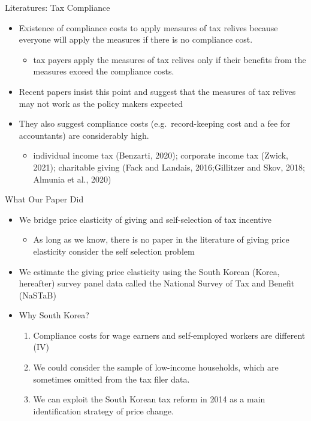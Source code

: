 \documentclass[
  ignorenonframetext,
  aspectratio=169,
]{beamer}
\providecommand{\tightlist}{%
  \setlength{\itemsep}{0pt}\setlength{\parskip}{0pt}}
\begin{document}
\begin{frame}{Literatures: Tax Compliance}
\protect\hypertarget{literatures-tax-compliance}{}
\begin{itemize}
\tightlist
\item
  Existence of compliance costs to apply measures of tax relives because everyone will apply the measures if there is no compliance cost.

  \begin{itemize}
  \tightlist
  \item
    tax payers apply the measures of tax relives only if their benefits from the measures exceed the compliance costs.
  \end{itemize}
\item
  Recent papers insist this point and suggest that the measures of tax relives may not work as the policy makers expected
\item
  They also suggest compliance costs (e.g.~record-keeping cost and a fee for accountants) are considerably high.

  \begin{itemize}
  \tightlist
  \item
    individual income tax (Benzarti, 2020); corporate income tax (Zwick, 2021); charitable giving (Fack and Landais, 2016;Gillitzer and Skov, 2018; Almunia et al., 2020)
  \end{itemize}
\end{itemize}
\end{frame}

\begin{frame}{What Our Paper Did}
\protect\hypertarget{what-our-paper-did}{}
\begin{itemize}
\tightlist
\item
  We bridge price elasticity of giving and self-selection of tax incentive

  \begin{itemize}
  \tightlist
  \item
    As long as we know, there is no paper in the literature of giving price elasticity consider the self selection problem
  \end{itemize}
\item
  We estimate the giving price elasticity using the South Korean (Korea, hereafter) survey panel data called the National Survey of Tax and Benefit (NaSTaB)
\item
  Why South Korea?

  \begin{enumerate}
  \tightlist
  \item
    Compliance costs for wage earners and self-employed workers are different (IV)
  \item
    We could consider the sample of low-income households, which are sometimes omitted from the tax filer data.
  \item
    We can exploit the South Korean tax reform in 2014 as a main identification strategy of price change.
  \end{enumerate}
\end{itemize}
\end{frame}
\end{document}

